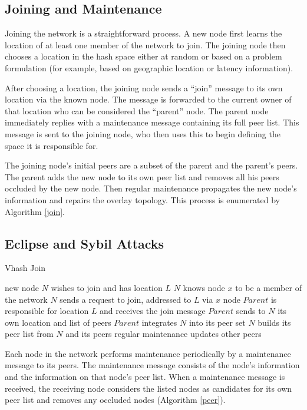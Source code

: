 \documentclass{IEEEtran}
\begin{document}
\subsection{Joining and Maintenance}
Joining the network is a straightforward process. A new node first learns the location of at least one member of the network to join. The joining node then chooses a location in the hash space either at random or based on a problem formulation (for example, based on geographic location or latency information).

After choosing a location, the joining node sends a ``join'' message to its own location via the known node.
The message is forwarded to the current owner of that location who can be considered the ``parent'' node.
The parent node immediately replies with a maintenance message containing its full peer list. This message is sent to the joining node, who then uses this to begin defining the space it is responsible for. 

The joining node's initial peers are a subset of the parent and the parent's peers. The parent adds the new node to its own peer list and removes all his peers occluded by the new node.  Then regular maintenance propagates the new node's information and repairs the overlay topology.  This process is enumerated by Algorithm \ref{join}.



\subsection{Eclipse and Sybil Attacks}

\begin{algorithm}
\caption{Vhash Join}
\label{join}
\begin{algorithmic}[1]  %
\STATE new node $N$ wishes to join and has location $L$
\STATE $N$ knows node $x$ to be a member of the network
\STATE $N$ sends a request to join, addressed to $L$ via $x$
\STATE node $Parent$ is responsible for location $L$ and receives the join message
\STATE $Parent$ sends to $N$ its own location and list of peers
\STATE $Parent$ integrates $N$ into its peer set
\STATE $N$ builds its peer list from $N$ and its peers
\STATE regular maintenance updates other peers
\end{algorithmic}
\end{algorithm}


Each node in the network performs maintenance periodically by a maintenance message to its peers. The maintenance message consists of the node's information and the information on that node's peer list. When a maintenance message is received, the receiving node considers the listed nodes as candidates for its own peer list and removes any occluded nodes (Algorithm \ref{peer}). 
\end{document}
